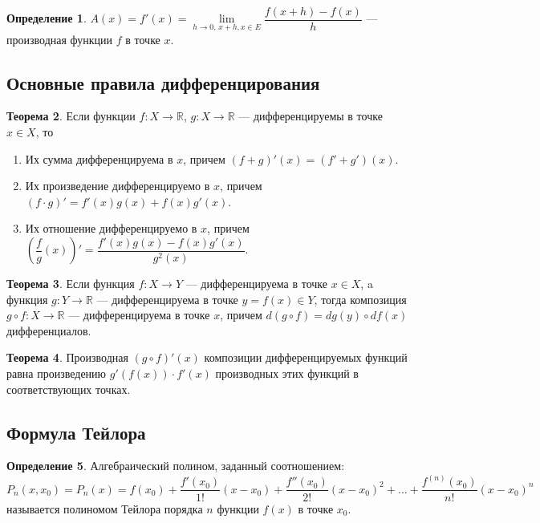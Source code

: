 \documentclass[12pt]{report}
\theoremstyle{definition}
\newtheorem{theorem}{Теорема}[chapter]
\newtheorem{definition}[theorem]{Определение}
\newcommand{\R}{\mathbb R}
\begin{document}
\begin{definition}
$A(x) = f'(x) = \lim\limits_{h\rightarrow 0,\, x+h, x\in E} \dfrac{f(x + h) - f(x)}{h}$ --- производная
функции $f$ в точке $x$.
\end{definition}

\subsection{Основные правила дифференцирования}
\begin{theorem}
Если функции $f: X \rightarrow \R$, $g: X \rightarrow \R$ --- дифференцируемы
в точке $x \in X$, то
\begin{enumerate}
  \item Их сумма дифференцируема в $x$, причем $(f + g)'(x) = (f' + g')(x)$.
  \item Их произведение дифференцируемо в $x$, причем $(f \cdot g)' = f'(x) g(x) + f(x) g'(x)$.
  \item Их отношение дифференцируемо в $x$, причем $\left(\dfrac{f}{g}(x)\right)' = \dfrac{f'(x) g(x) - f(x) g'(x)}{g^2(x)}$.
\end{enumerate}
\end{theorem}

\begin{theorem}
Если функция $f: X \rightarrow Y$ --- дифференцируема в точке $x \in X$,
a функция $g: Y \rightarrow \R$ --- дифференцируема в точке $y = f(x) \in Y$,
тогда композиция $g \circ f: X \rightarrow \R$ --- дифференцируема в точке $x$,
причем $d (g \circ f) = dg(y) \circ df(x)$ дифференциалов.
\end{theorem}

\begin{theorem}
Производная $(g \circ f)'(x)$ композиции дифференцируемых функций равна
произведению $g'(f(x)) \cdot f'(x)$ производных этих функций в соответствующих точках.
\end{theorem}

\subsection{Формула Тейлора}

\begin{definition}
Алгебраический полином, заданный соотношением:
$$
P_n(x, x_0) = P_n(x) = f(x_0) + \dfrac{f'(x_0)}{1!}(x - x_0) + \dfrac{f''(x_0)}{2!}(x - x_0)^2
+ \dots + \dfrac{f^{(n)}(x_0)}{n!} (x - x_0)^n
$$
называется полиномом Тейлора порядка $n$ функции $f(x)$ в точке $x_0$.
\end{definition}
\end{document}
